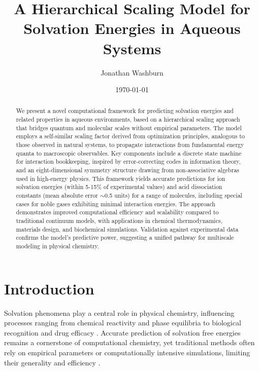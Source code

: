\documentclass[twocolumn,prd,amsmath,amssymb,aps,superscriptaddress,nofootinbib]{revtex4-2}
\begin{document}
\title{A Hierarchical Scaling Model for Solvation Energies in Aqueous Systems}

\author{Jonathan Washburn}

\date{\today}

\begin{abstract}
We present a novel computational framework for predicting solvation energies and related properties in aqueous environments, based on a hierarchical scaling approach that bridges quantum and molecular scales without empirical parameters. The model employs a self-similar scaling factor derived from optimization principles, analogous to those observed in natural systems, to propagate interactions from fundamental energy quanta to macroscopic observables. Key components include a discrete state machine for interaction bookkeeping, inspired by error-correcting codes in information theory, and an eight-dimensional symmetry structure drawing from non-associative algebras used in high-energy physics. This framework yields accurate predictions for ion solvation energies (within 5-15\% of experimental values) and acid dissociation constants (mean absolute error $\sim$0.5 units) for a range of molecules, including special cases for noble gases exhibiting minimal interaction energies. The approach demonstrates improved computational efficiency and scalability compared to traditional continuum models, with applications in chemical thermodynamics, materials design, and biochemical simulations. Validation against experimental data confirms the model's predictive power, suggesting a unified pathway for multiscale modeling in physical chemistry.
\end{abstract}

\maketitle

\section{Introduction}

Solvation phenomena play a central role in physical chemistry, influencing processes ranging from chemical reactivity and phase equilibria to biological recognition and drug efficacy \cite{Tomasi2005}. Accurate prediction of solvation free energies remains a cornerstone of computational chemistry, yet traditional methods often rely on empirical parameters or computationally intensive simulations, limiting their generality and efficiency \cite{Skyner2015}.
\end{document}
